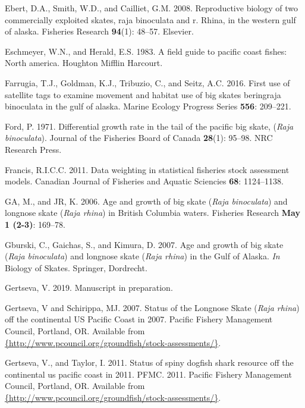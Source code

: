 \documentclass[12pt,]{article}
\begin{document}
\leavevmode\hypertarget{ref-Ebert2008}{}%
Ebert, D.A., Smith, W.D., and Cailliet, G.M. 2008. Reproductive biology
of two commercially exploited skates, raja binoculata and r. Rhina, in
the western gulf of alaska. Fisheries Research \textbf{94}(1): 48--57.
Elsevier.

\leavevmode\hypertarget{ref-Eschmeyer1983}{}%
Eschmeyer, W.N., and Herald, E.S. 1983. A field guide to pacific coast
fishes: North america. Houghton Mifflin Harcourt.

\leavevmode\hypertarget{ref-Farrugia2016}{}%
Farrugia, T.J., Goldman, K.J., Tribuzio, C., and Seitz, A.C. 2016. First
use of satellite tags to examine movement and habitat use of big skates
beringraja binoculata in the gulf of alaska. Marine Ecology Progress
Series \textbf{556}: 209--221.

\leavevmode\hypertarget{ref-Ford1971}{}%
Ford, P. 1971. Differential growth rate in the tail of the pacific big
skate, (\emph{Raja binoculata}). Journal of the Fisheries Board of
Canada \textbf{28}(1): 95--98. NRC Research Press.

\leavevmode\hypertarget{ref-Francis2011}{}%
Francis, R.I.C.C. 2011. Data weighting in statistical fisheries stock
assessment models. Canadian Journal of Fisheries and Aquatic Sciencies
\textbf{68}: 1124--1138.

\leavevmode\hypertarget{ref-McFandKing2006}{}%
GA, M., and JR, K. 2006. Age and growth of big skate (\emph{Raja
binoculata}) and longnose skate (\emph{Raja rhina}) in British Columbia
waters. Fisheries Research \textbf{May 1 (2-3)}: 169--78.

\leavevmode\hypertarget{ref-Gburski2007}{}%
Gburski, C., Gaichas, S., and Kimura, D. 2007. Age and growth of big
skate (\emph{Raja binoculata}) and longnose skate (\emph{Raja rhina}) in
the Gulf of Alaska. \emph{In} Biology of Skates. Springer, Dordrecht.

\leavevmode\hypertarget{ref-Gertseva2019}{}%
Gertseva, V. 2019. Manuscript in preparation.

\leavevmode\hypertarget{ref-Gertseva2007}{}%
Gertseva, V and Schirippa, MJ. 2007. Status of the Longnose Skate
(\emph{Raja rhina}) off the continental US Pacific Coast in 2007.
Pacific Fishery Management Council, Portland, OR. Available from
\href{\%7Bhttp://www.pcouncil.org/groundfish/stock-assessments/\%7D}{\{http://www.pcouncil.org/groundfish/stock-assessments/\}}.

\leavevmode\hypertarget{ref-Gertseva2011}{}%
Gertseva, V., and Taylor, I. 2011. Status of spiny dogfish shark
resource off the continental us pacific coast in 2011. PFMC. 2011.
Pacific Fishery Management Council, Portland, OR. Available from
\href{\%7Bhttp://www.pcouncil.org/groundfish/stock-assessments/\%7D}{\{http://www.pcouncil.org/groundfish/stock-assessments/\}}.
\end{document}
